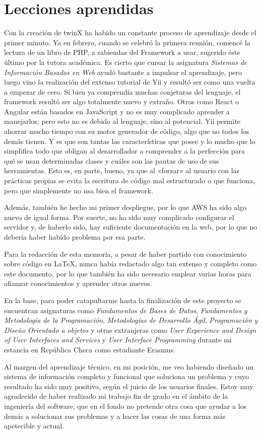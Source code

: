 \section{Lecciones aprendidas}

Con la creación de twinX ha habido un constante proceso de aprendizaje desde el primer minuto. Ya en febrero, cuando se celebró la primera reunión, comencé la lectura de un libro de PHP, a sabiendas del Framework a usar, sugerido éste último por la tutora académica. Es cierto que cursar la asignatura \textit{Sistemas de Información Basados en Web} ayudó bastante a impulsar el aprendizaje, pero luego vino la realización del extenso tutorial de Yii y resultó ser como una vuelta a empezar de cero. Si bien ya comprendía muchas conjeturas del lenguaje, el framework resultó ser algo totalmente nuevo y extraño. Otros como React o Angular están basados en JavaScript y no es muy complicado aprender a manejarlos; pero esto no es debido al lenguaje, sino al potencial. Yii permite ahorrar mucho tiempo con su motor generador de código, algo que no todos los demás tienen. Y es que son tantas las características que posee y lo mucho que lo simplifica todo que obligan al desarrollador a comprender a la perfección para qué se usan determinadas clases y cuáles son las pautas de uso de sus herramientas. Esto es, en parte, bueno, ya que al «forzar» al usuario con las prácticas propias se evita la escritura de código mal estructurado o que funciona, pero que simplemente no usa bien el framework.

Además, también he hecho mi primer despliegue, por lo que AWS ha sido algo nuevo de igual forma. Por suerte, no ha sido muy complicado configurar el servidor y, de haberlo sido, hay suficiente documentación en la web, por lo que no debería haber habido problema por esa parte.

Para la redacción de esta memoria, a pesar de haber partido con conocimiento sobre código en \LaTeX, nunca había redactado algo tan extenso y completo como este documento, por lo que también ha sido necesario emplear varias horas para afianzar conocimientos y aprender otros nuevos.

En la base, para poder catapultarme hasta la finalización de este proyecto se encuentran asignaturas como \textit{Fundamentos de Bases de Datos}, \textit{Fundamentos y Metodología de la Programación}, \textit{Metodologías de Desarrollo Ágil}, \textit{Programación y Diseño Orientado a objetos} y otras extranjeras como \textit{User Experience and Design of User Interfaces and Services} y \textit{User Interface Programming} durante mi estancia en República Checa como estudiante Erasmus.

Al margen del aprendizaje técnico, en mi posición, me veo habiendo diseñado un sistema de información completo y funcional que soluciona un problema y cuyo resultado ha sido muy positivo, según el juicio de los usuarios finales. Estoy muy agradecido de haber realizado mi trabajo fin de grado en el ámbito de la ingeniería del software, que en el fondo no pretende otra cosa que ayudar a los demás a solucionar sus problemas y a hacer las cosas de una forma más apetecible y actual.